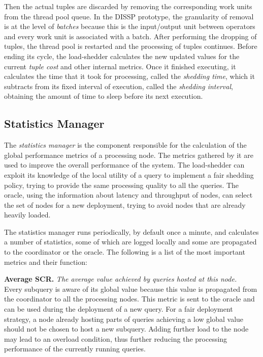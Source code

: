Then the actual tuples are discarded by removing the corresponding work units from the thread pool queue.
In the DISSP prototype, the granularity of removal is at the level of \emph{batches} because this is the
input/output unit between operators and every work unit is associated with a batch. After performing the
dropping of tuples, the thread pool is restarted and the processing of tuples continues. Before ending
its cycle, the load-shedder calculates the new updated values for the current \emph{tuple cost} and other
internal metrics. Once it finished executing, it calculates the time that it took for processing, called
the \emph{shedding time}, which it subtracts from its fixed interval of execution, called the
\emph{shedding interval}, obtaining the amount of time to sleep before its next execution.

\subsection*{Statistics Manager}
The \emph{statistics manager} is the component responsible for the calculation of the global performance
metrics of a processing node. The metrics gathered by it are used to improve the overall
performance of the system. The load-shedder can exploit its knowledge of the local utility of a
query to implement a fair shedding policy, trying to provide the same processing quality to
all the queries. The oracle, using the information about latency and throughput of nodes, can select the set of
nodes for a new deployment, trying to avoid nodes that are already heavily loaded.

The statistics manager runs periodically, by default once a minute, and calculates a number of
statistics, some of which are logged locally and some are propagated to the coordinator or the
oracle. The following is a list of the most important metrics and their function:

\textbf{Average SCR.} \emph{The average \sic value achieved by queries hosted at this node.}\\
Every subquery is aware of its global \sic value because this value is propagated from the coordinator to
all the processing nodes. This metric is sent to the oracle and can be used during the deployment of
a new query. For a fair deployment strategy, a node already hosting parts of queries
achieving a low global \sic value should not be chosen to host a new subquery. Adding further load
to the node may lead to an overload condition, thus further reducing the processing performance of the
currently running queries. 

